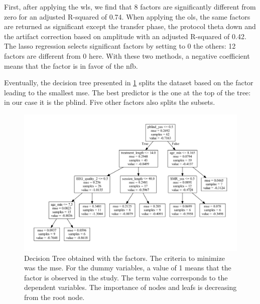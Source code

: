 First, after applying the \gls{wls}, we find that 8 factors are significantly different from zero for an adjusted R-squared of 0.74. 
When applying the \gls{ols}, the same factors are returned as significant except the transfer phase, the protocol theta down and the artifact correction
based on amplitude with an adjusted R-squared of 0.42. The \gls{lasso} regression selects significant factors by setting to 0 the others: 12 factors 
are different from 0 here. With these two methods, a negative coefficient means that the factor is in favor of the \gls{nfb}.

Eventually, the decision tree presented in \cref{Figure:factors_analysis_decision_tree_results} splits the dataset based on the factor leading to the
smallest \gls{mse}. The best predictor is the one at the top of the tree: in our case it is the \gls{pblind}. Five other factors also splits the subsets. 

\begin{figure}[h!]
  \centering
  \includegraphics[width=1.0\linewidth]{figures/factors_analysis_decision_tree_results_no_colors_2-columns_fitting_image}
  \caption{Decision Tree obtained with the factors. The criteria to minimize was the \gls{mse}. For the dummy variables, a value of 1 means
	that the factor is observed in the study. The term value corresponds to the dependent variables. The importance of nodes and leafs is decreasing
	from the root node.}
  \label{Figure:factors_analysis_decision_tree_results}
\end{figure}

